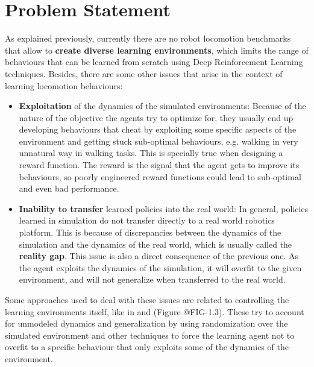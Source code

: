 \figDrlBenchmarks

\section{Problem Statement}
\label{sec:problem}

As explained previously, currently there are no robot locomotion benchmarks that allow
to \textbf{create diverse learning environments}, which limits the range of behaviours that can be learned
from scratch using Deep Reinforcement Learning techniques. Besides, there are some other issues 
that arise in the context of learning locomotion behaviours:

\begin{itemize}
	\item \textbf{Exploitation} of the dynamics of the simulated environments: 
			Because of the nature of the objective the agents try to optimize for, they usually
			end up developing behaviours that cheat by exploiting some specific aspects of the environment
			and getting stuck sub-optimal behaviours, e.g. walking in very unnatural way in walking tasks.
			This is specially true when designing a reward function. The reward is the signal
			that the agent gets to improve its behaviours, so poorly engineered reward functions could lead to sub-optimal and even bad performance.
	\item \textbf{Inability to transfer} learned  policies into the real world:
			In general, policies learned in simulation do not transfer directly to a real world robotics
			platform. This is because of discrepancies between the dynamics of the simulation and
			the dynamics of the real world, which is usually called the \textbf{reality gap}.
			This issue is also a direct consequence of the previous one. As the agent exploits the 
			dynamics of the simulation, it will overfit to the given environment, and will 
			not generalize when transferred to the real world.
\end{itemize}

Some approaches used to deal with these issues are related to controlling the learning 
environments itself, like in \citeauthor{GoogleBrainSim2Real} and \citeauthor{OpenAISim2real} (Figure @FIG-1.3). 
These try to account for unmodeled dynamics and generalization by using randomization
over the simulated environment and other techniques to force the learning agent not to 
overfit to a specific behaviour that only exploits some of the dynamics of the environment.

